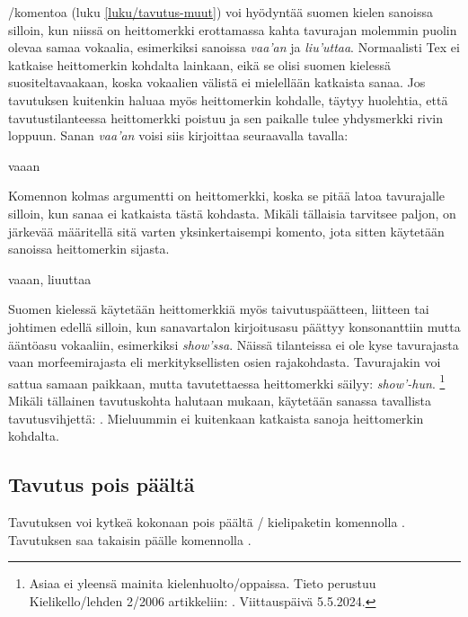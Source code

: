 \noindent
{}\-/komentoa (luku \ref{luku/tavutus-muut}) voi
hyödyntää suomen kielen sanoissa silloin, kun niissä on heittomerkki
erottamassa kahta tavurajan molemmin puolin olevaa samaa vokaalia,
esimerkiksi sanoissa \emph{vaa'an} ja \emph{liu'uttaa}. Normaalisti Tex
ei katkaise heittomerkin kohdalta lainkaan, eikä se olisi suomen
kielessä suositeltavaakaan, koska vokaalien välistä ei mielellään
katkaista sanaa. Jos tavutuksen kuitenkin haluaa myös heittomerkin
kohdalle, täytyy huolehtia, että tavutustilanteessa heittomerkki poistuu
ja sen paikalle tulee yhdysmerkki rivin loppuun. Sanan \emph{vaa'an}
voisi siis kirjoittaa seuraavalla tavalla:

\begin{koodilohkosis}
vaaan
\end{koodilohkosis}

\noindent
Komennon kolmas argumentti on heittomerkki, koska se pitää latoa
tavurajalle silloin, kun sanaa ei katkaista tästä kohdasta. Mikäli
tällaisia tarvitsee paljon, on järkevää määritellä sitä varten
yksinkertaisempi komento, jota sitten käytetään sanoissa heittomerkin
sijasta.

\begin{koodilohkosis}
\newcommand{\hm}{}
vaa\hm an, liu\hm uttaa
\end{koodilohkosis}

\noindent
Suomen kielessä käytetään heittomerkkiä myös taivutuspäätteen, liitteen
tai johtimen edellä silloin, kun sanavartalon kirjoitusasu päättyy
konsonanttiin mutta ääntöasu vokaaliin, esimerkiksi \emph{show'ssa}.
Näissä tilanteissa ei ole kyse tavurajasta vaan morfeemirajasta eli
merkityksellisten osien rajakohdasta. Tavurajakin voi sattua samaan
paikkaan, mutta tavutettaessa heittomerkki säilyy: \emph{show'-hun}.%
\footnote{Asiaa ei yleensä mainita kielenhuolto\-/oppaissa. Tieto
  perustuu Kielikello\-/lehden 2/2006 artikkeliin:
  . Viittauspäivä
  5.5.2024.} Mikäli tällainen tavutuskohta halutaan mukaan, käytetään
sanassa tavallista tavutusvihjettä: \komento{-}.
Mieluummin ei kuitenkaan katkaista sanoja heittomerkin kohdalta.

\subsection{Tavutus pois päältä}

Tavutuksen voi kytkeä kokonaan pois päältä \-/
kielipaketin komennolla . Tavutuksen saa
takaisin päälle komennolla .


